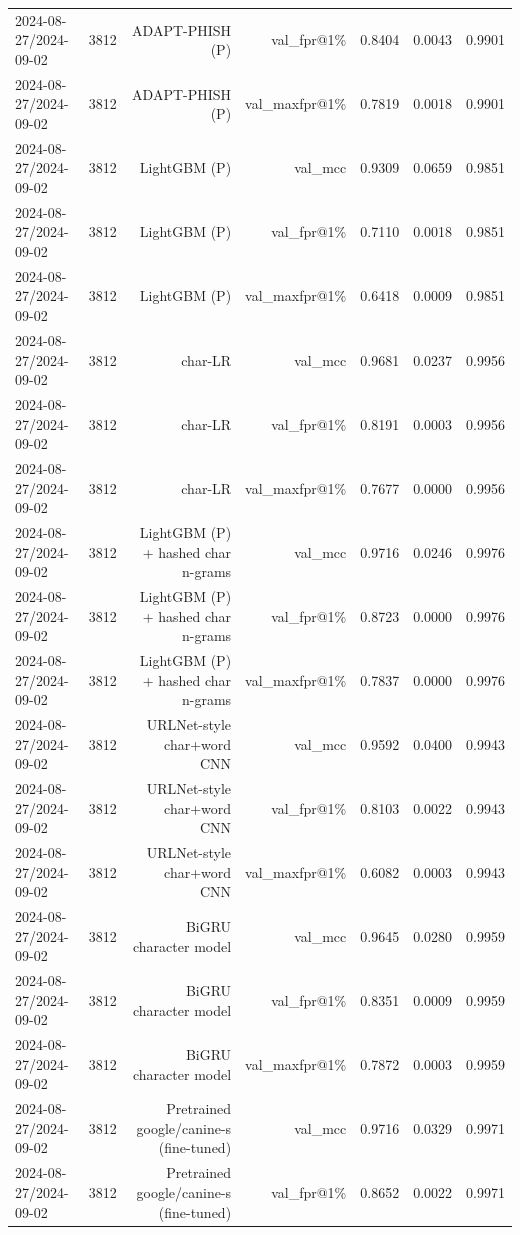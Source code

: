 \begin{table}[t]
\begin{tabular}{llrrrrr}
2024-08-27/2024-09-02 & 3812 & ADAPT-PHISH (P) & val\_fpr@1\% & 0.8404 & 0.0043 & 0.9901 \\
2024-08-27/2024-09-02 & 3812 & ADAPT-PHISH (P) & val\_maxfpr@1\% & 0.7819 & 0.0018 & 0.9901 \\
2024-08-27/2024-09-02 & 3812 & LightGBM (P) & val\_mcc & 0.9309 & 0.0659 & 0.9851 \\
2024-08-27/2024-09-02 & 3812 & LightGBM (P) & val\_fpr@1\% & 0.7110 & 0.0018 & 0.9851 \\
2024-08-27/2024-09-02 & 3812 & LightGBM (P) & val\_maxfpr@1\% & 0.6418 & 0.0009 & 0.9851 \\
2024-08-27/2024-09-02 & 3812 & char-LR & val\_mcc & 0.9681 & 0.0237 & 0.9956 \\
2024-08-27/2024-09-02 & 3812 & char-LR & val\_fpr@1\% & 0.8191 & 0.0003 & 0.9956 \\
2024-08-27/2024-09-02 & 3812 & char-LR & val\_maxfpr@1\% & 0.7677 & 0.0000 & 0.9956 \\
2024-08-27/2024-09-02 & 3812 & LightGBM (P) + hashed char n-grams & val\_mcc & 0.9716 & 0.0246 & 0.9976 \\
2024-08-27/2024-09-02 & 3812 & LightGBM (P) + hashed char n-grams & val\_fpr@1\% & 0.8723 & 0.0000 & 0.9976 \\
2024-08-27/2024-09-02 & 3812 & LightGBM (P) + hashed char n-grams & val\_maxfpr@1\% & 0.7837 & 0.0000 & 0.9976 \\
2024-08-27/2024-09-02 & 3812 & URLNet-style char+word CNN & val\_mcc & 0.9592 & 0.0400 & 0.9943 \\
2024-08-27/2024-09-02 & 3812 & URLNet-style char+word CNN & val\_fpr@1\% & 0.8103 & 0.0022 & 0.9943 \\
2024-08-27/2024-09-02 & 3812 & URLNet-style char+word CNN & val\_maxfpr@1\% & 0.6082 & 0.0003 & 0.9943 \\
2024-08-27/2024-09-02 & 3812 & BiGRU character model & val\_mcc & 0.9645 & 0.0280 & 0.9959 \\
2024-08-27/2024-09-02 & 3812 & BiGRU character model & val\_fpr@1\% & 0.8351 & 0.0009 & 0.9959 \\
2024-08-27/2024-09-02 & 3812 & BiGRU character model & val\_maxfpr@1\% & 0.7872 & 0.0003 & 0.9959 \\
2024-08-27/2024-09-02 & 3812 & Pretrained google/canine-s (fine-tuned) & val\_mcc & 0.9716 & 0.0329 & 0.9971 \\
2024-08-27/2024-09-02 & 3812 & Pretrained google/canine-s (fine-tuned) & val\_fpr@1\% & 0.8652 & 0.0022 & 0.9971 \\

\end{tabular}
\end{table}
